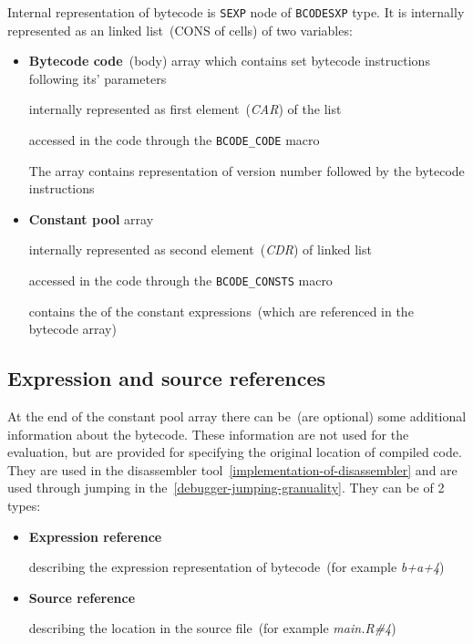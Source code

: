 \documentclass[thesis=M,english]{FITthesis}[2018/10/20]
\newcommand{\code}[1]{\texttt{#1}}
\begin{document}
Internal representation of bytecode is \code{SEXP} node of \code{BCODESXP} type. It is internally represented as an linked list~(CONS of cells) of two variables:
\begin{itemize}
	\item \textbf{Bytecode code}~(body) array which contains set bytecode instructions following its' parameters

		\hspace*{6mm} internally represented as first element~(\textit{CAR}) of the list
		
		\hspace*{6mm} accessed in the code through the \code{BCODE{\_}CODE} macro

		\hspace*{6mm} The array contains representation of version number followed by the bytecode instructions 

	\item \textbf{Constant pool} array

		\hspace*{6mm} internally represented as second element~(\textit{CDR}) of linked list

		\hspace*{6mm} accessed in the code through the \code{BCODE{\_}CONSTS} macro

		\hspace*{6mm} contains the of the constant expressions~(which are referenced in the bytecode array)

\end{itemize}

\subsection{Expression and source references}\label{Exprref-and-srcref}

At the end of the constant pool array there can be~(are optional) some additional information about the bytecode. These information are not used for the evaluation, but are provided for specifying the original location of compiled code. They are used in the disassembler tool~\ref{implementation-of-disassembler} and are used through jumping in the~\ref{debugger-jumping-granuality}. They can be of 2 types:

\begin{itemize}
	\item \textbf{Expression reference}

describing the expression representation of bytecode~(for example \textit{b+a+4})

	\item \textbf{Source reference}

describing the location in the source file~(for example \textit{main.R{\#}4})
\end{itemize}
\end{document}
